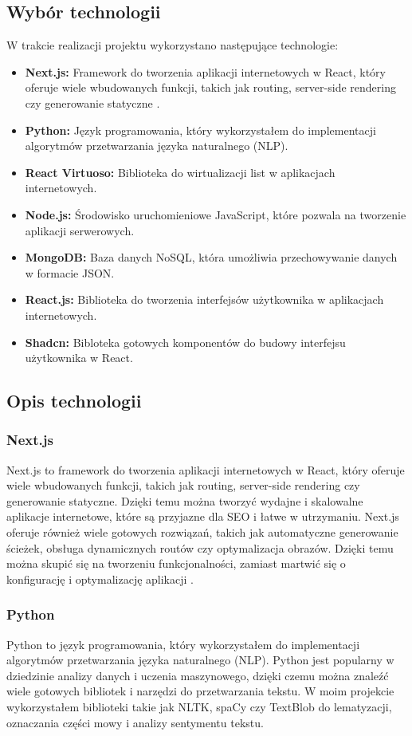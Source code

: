 \subsection{Wybór technologii}
W trakcie realizacji projektu wykorzystano następujące technologie:
\begin{itemize}
    \item \textbf{Next.js:} Framework do tworzenia aplikacji internetowych w React, który oferuje wiele wbudowanych funkcji, takich jak routing, server-side rendering czy generowanie statyczne \cite{nextjs}.
    \item \textbf{Python:} Język programowania, który wykorzystałem do implementacji algorytmów przetwarzania języka naturalnego (NLP).
    \item \textbf{React Virtuoso:} Biblioteka do wirtualizacji list w aplikacjach internetowych.
    \item \textbf{Node.js:} Środowisko uruchomieniowe JavaScript, które pozwala na tworzenie aplikacji serwerowych.
    \item \textbf{MongoDB:} Baza danych NoSQL, która umożliwia przechowywanie danych w formacie JSON.
    \item \textbf{React.js:} Biblioteka do tworzenia interfejsów użytkownika w aplikacjach internetowych.
    \item \textbf{Shadcn:} Bibloteka gotowych komponentów do budowy interfejsu użytkownika w React.
\end{itemize}

\subsection{Opis technologii}
\subsubsection{Next.js}
Next.js to framework do tworzenia aplikacji internetowych w React, który oferuje wiele wbudowanych funkcji, takich jak routing, server-side rendering czy generowanie statyczne. Dzięki temu można tworzyć wydajne i skalowalne aplikacje internetowe, które są przyjazne dla SEO i łatwe w utrzymaniu. Next.js oferuje również wiele gotowych rozwiązań, takich jak automatyczne generowanie ścieżek, obsługa dynamicznych routów czy optymalizacja obrazów. Dzięki temu można skupić się na tworzeniu funkcjonalności, zamiast martwić się o konfigurację i optymalizację aplikacji \cite{nextjs}.

\subsubsection{Python}
Python to język programowania, który wykorzystałem do implementacji algorytmów przetwarzania języka naturalnego (NLP). Python jest popularny w dziedzinie analizy danych i uczenia maszynowego, dzięki czemu można znaleźć wiele gotowych bibliotek i narzędzi do przetwarzania tekstu. W moim projekcie wykorzystałem biblioteki takie jak NLTK, spaCy czy TextBlob do lematyzacji, oznaczania części mowy i analizy sentymentu tekstu.

